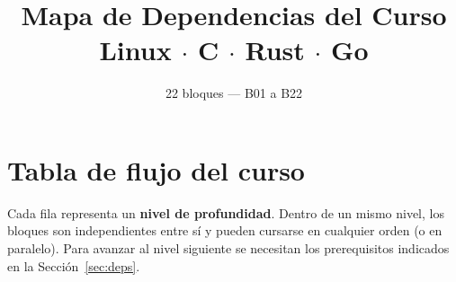 \documentclass[11pt, letterpaper]{article}
\title{%
  Mapa de Dependencias del Curso\\[4pt]
  \large Linux $\cdot$ C $\cdot$ Rust $\cdot$ Go
}
\author{22 bloques --- B01 a B22}
\date{}
\begin{document}
\maketitle

\section{Tabla de flujo del curso}

Cada fila representa un \textbf{nivel de profundidad}. Dentro de un
mismo nivel, los bloques son independientes entre sí y pueden cursarse
en cualquier orden (o en paralelo). Para avanzar al nivel siguiente se
necesitan los prerequisitos indicados en la Sección~\ref{sec:deps}.

\bigskip

\renewcommand{\arraystretch}{1.8}
\setlength{\tabcolsep}{3pt}
\end{document}
